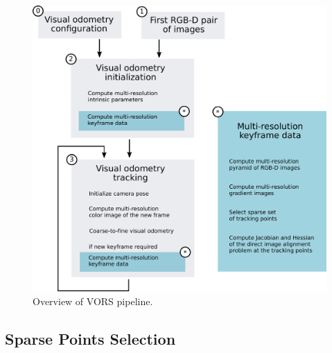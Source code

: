 \begin{figure}[ht]
	\centering
	\includegraphics[width=\linewidth]{assets/img/overview-vors.pdf}
	\caption{Overview of VORS pipeline.}%
	\label{fig:overview-vors}
\end{figure}

\subsection{Sparse Points Selection}%
\label{sub:sparse-points}

